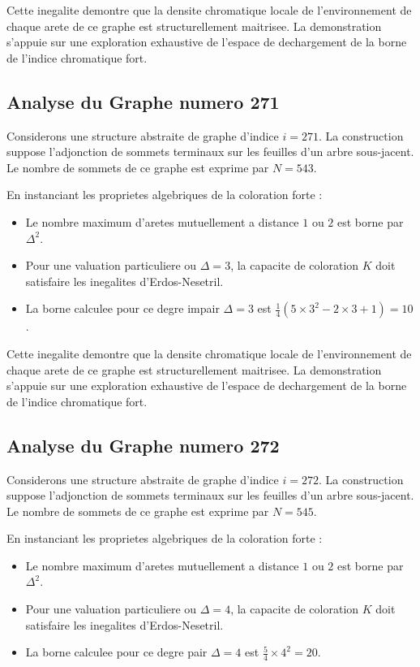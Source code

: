 \documentclass[11pt,a4paper]{article}
\begin{document}
Cette inegalite demontre que la densite chromatique locale de l'environnement de chaque arete de ce graphe est structurellement maitrisee. La demonstration s'appuie sur une exploration exhaustive de l'espace de dechargement de la borne de l'indice chromatique fort.

\subsection{Analyse du Graphe numero 271}
Considerons une structure abstraite de graphe d'indice $i = 271$. La construction suppose l'adjonction de sommets terminaux sur les feuilles d'un arbre sous-jacent. Le nombre de sommets de ce graphe est exprime par $N = 543$.

En instanciant les proprietes algebriques de la coloration forte :
\begin{itemize}
\item Le nombre maximum d'aretes mutuellement a distance $1$ ou $2$ est borne par $\Delta^2$.
\item Pour une valuation particuliere ou $\Delta = 3$, la capacite de coloration $K$ doit satisfaire les inegalites d'Erdos-Nesetril.
\item La borne calculee pour ce degre impair $\Delta = 3$ est $\frac{1}{4}(5 \times 3^2 - 2 \times 3 + 1) = 10$.
\end{itemize}

Cette inegalite demontre que la densite chromatique locale de l'environnement de chaque arete de ce graphe est structurellement maitrisee. La demonstration s'appuie sur une exploration exhaustive de l'espace de dechargement de la borne de l'indice chromatique fort.

\subsection{Analyse du Graphe numero 272}
Considerons une structure abstraite de graphe d'indice $i = 272$. La construction suppose l'adjonction de sommets terminaux sur les feuilles d'un arbre sous-jacent. Le nombre de sommets de ce graphe est exprime par $N = 545$.

En instanciant les proprietes algebriques de la coloration forte :
\begin{itemize}
\item Le nombre maximum d'aretes mutuellement a distance $1$ ou $2$ est borne par $\Delta^2$.
\item Pour une valuation particuliere ou $\Delta = 4$, la capacite de coloration $K$ doit satisfaire les inegalites d'Erdos-Nesetril.
\item La borne calculee pour ce degre pair $\Delta = 4$ est $\frac{5}{4} \times 4^2 = 20$.
\end{itemize}
\end{document}
